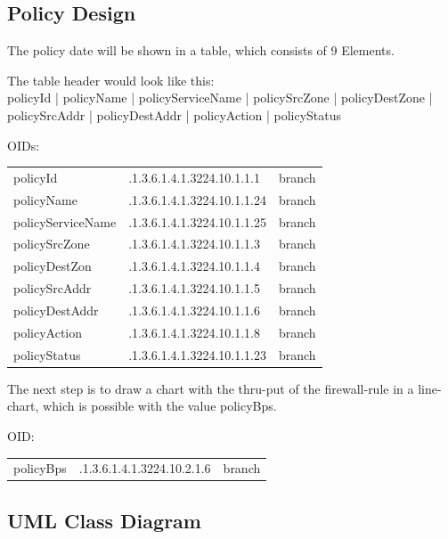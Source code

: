 \documentclass[a4paper,12pt]{scrreprt}
\begin{document}
\subsection{Policy Design}
The policy date will be shown in a table, which consists of 9 Elements. 
\begin{description}
\item The table header would look like this:\\
{policyId} | {policyName} | {policyServiceName} | {policySrcZone} | {policyDestZone} | {policySrcAddr} | {policyDestAddr} | {policyAction} | {policyStatus}
\item OIDs:\\
\begin{tabular}{l l l} 
policyId & .1.3.6.1.4.1.3224.10.1.1.1 & branch\\
policyName & .1.3.6.1.4.1.3224.10.1.1.24 & branch\\
policyServiceName & .1.3.6.1.4.1.3224.10.1.1.25 & branch\\
policySrcZone & .1.3.6.1.4.1.3224.10.1.1.3 & branch\\
policyDestZon & .1.3.6.1.4.1.3224.10.1.1.4 & branch\\
policySrcAddr & .1.3.6.1.4.1.3224.10.1.1.5 & branch\\
policyDestAddr & .1.3.6.1.4.1.3224.10.1.1.6 & branch\\
policyAction & .1.3.6.1.4.1.3224.10.1.1.8 & branch\\
policyStatus & .1.3.6.1.4.1.3224.10.1.1.23 & branch\\
\end{tabular}

\end{description}
The next step is to draw a chart with the thru-put of the firewall-rule in a line-chart, which is possible with the value policyBps. 

\begin{description}
\item OID:\\
\begin{tabular}{l l l} 
policyBps & .1.3.6.1.4.1.3224.10.2.1.6 & branch\\
\end{tabular}
\end{description}

\subsection{UML Class Diagram}
\end{document}
